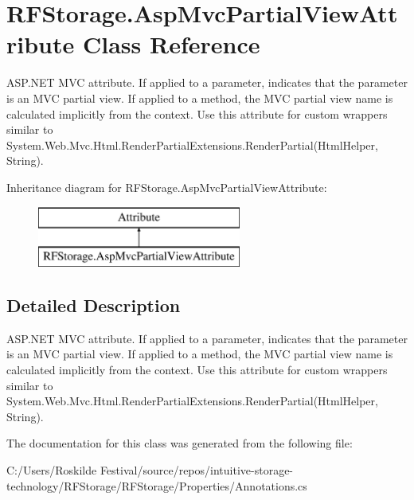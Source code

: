 \hypertarget{class_r_f_storage_1_1_asp_mvc_partial_view_attribute}{}\section{R\+F\+Storage.\+Asp\+Mvc\+Partial\+View\+Attribute Class Reference}
\label{class_r_f_storage_1_1_asp_mvc_partial_view_attribute}


A\+S\+P.\+N\+ET M\+VC attribute. If applied to a parameter, indicates that the parameter is an M\+VC partial view. If applied to a method, the M\+VC partial view name is calculated implicitly from the context. Use this attribute for custom wrappers similar to {\ttfamily System.\+Web.\+Mvc.\+Html.\+Render\+Partial\+Extensions.\+Render\+Partial(\+Html\+Helper, String)}.  


Inheritance diagram for R\+F\+Storage.\+Asp\+Mvc\+Partial\+View\+Attribute\+:\begin{figure}[H]
\begin{center}
\leavevmode
\includegraphics[height=2.000000cm]{class_r_f_storage_1_1_asp_mvc_partial_view_attribute}
\end{center}
\end{figure}


\subsection{Detailed Description}
A\+S\+P.\+N\+ET M\+VC attribute. If applied to a parameter, indicates that the parameter is an M\+VC partial view. If applied to a method, the M\+VC partial view name is calculated implicitly from the context. Use this attribute for custom wrappers similar to {\ttfamily System.\+Web.\+Mvc.\+Html.\+Render\+Partial\+Extensions.\+Render\+Partial(\+Html\+Helper, String)}. 



The documentation for this class was generated from the following file\+:\begin{DoxyCompactItemize}
\item 
C\+:/\+Users/\+Roskilde Festival/source/repos/intuitive-\/storage-\/technology/\+R\+F\+Storage/\+R\+F\+Storage/\+Properties/Annotations.\+cs\end{DoxyCompactItemize}
